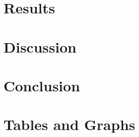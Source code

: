 \documentclass[a4paper,12pt]{article}
\begin{document}
\section{Results}


\section{Discussion}



\section{Conclusion}

\newpage



\appendix
\section{Tables and Graphs}
\end{document}
